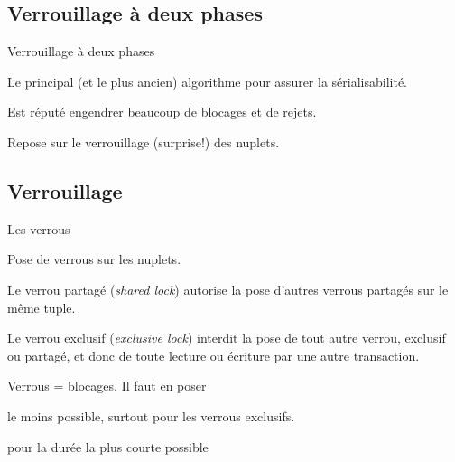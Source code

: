 
\subsection{Verrouillage à deux phases}


\begin{frame}{Verrouillage à deux phases}

Le principal (et le plus ancien) algorithme pour assurer la
sérialisabilité.

\vfill

Est réputé engendrer beaucoup de blocages et de rejets.

\vfill

Repose sur le verrouillage (surprise!) des nuplets.

\end{frame}


\subsection{Verrouillage}

\begin{frame}{Les verrous}

Pose de \alert{verrous} sur les nuplets.


\begin{redbullet}

   \item Le verrou \alert{partagé} (\textit{shared lock})
          autorise la pose d'autres verrous partagés sur le même tuple. 

   \item Le verrou \alert{exclusif} (\textit{exclusive lock})
           interdit la pose de tout autre verrou, 
           exclusif ou partagé, et donc de toute lecture ou écriture par une autre transaction.
\end{redbullet}

\vfill

Verrous = \alert{blocages}. Il faut
en poser

\begin{blocgauche}
\begin{redbullet}
   \item  \alert{le moins possible}, surtout pour les verrous exclusifs.
  \item \alert{pour la durée la plus courte possible}
\end{redbullet}
\end{blocgauche}

\end{frame}

